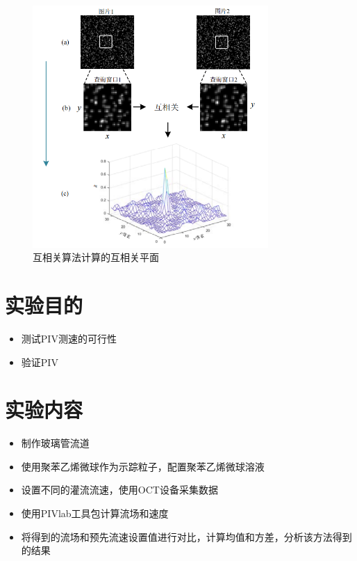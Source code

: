 \documentclass[12pt]{article}
\begin{document}
    \begin{figure}
        \centering
        \includegraphics[width=0.8\textwidth]{Images/互相关示意图.png}
        \caption{互相关算法计算的互相关平面}
        
    \end{figure}
    

\section{实验目的}
\begin{itemize}
    \item 测试PIV测速的可行性
    \item 验证PIV

\end{itemize}

\section{实验内容}
\begin{itemize}

    \item 制作玻璃管流道
    \item 使用聚苯乙烯微球作为示踪粒子，配置聚苯乙烯微球溶液
    \item 设置不同的灌流流速，使用OCT设备采集数据
    \item 使用PIVlab工具包计算流场和速度
    \item 将得到的流场和预先流速设置值进行对比，计算均值和方差，分析该方法得到的结果
\end{itemize}
\end{document}
